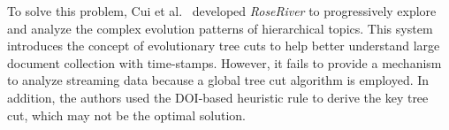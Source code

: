 To solve this problem, Cui et al.~\cite{cui2014} developed \emph{\normalsize RoseRiver} to progressively explore and analyze the complex evolution patterns of hierarchical topics.
This system introduces the concept of evolutionary tree cuts to help better understand large document collection with time-stamps.
However, it fails to provide a mechanism to analyze streaming data because a global tree cut algorithm is employed.
In addition, the authors used the DOI-based heuristic rule to derive the key tree cut, which may not be the optimal solution.

